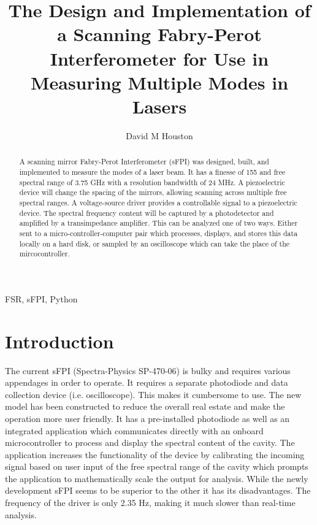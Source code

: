 \documentclass[12pt,journal]{IEEEtran}
\begin{document}
\title{The Design and Implementation of a Scanning Fabry-Perot Interferometer for Use in Measuring Multiple Modes in Lasers}
\author{David M Houston}

\maketitle


\begin{abstract}
A scanning mirror Fabry-Perot Interferometer (sFPI) was designed, built, and implemented to measure the modes of a laser beam. It has a finesse of 155 and free spectral range of 3.75 GHz with a resolution bandwidth of 24 MHz. A piezoelectric device will change the spacing of the mirrors, allowing scanning across multiple free spectral ranges. A voltage-source driver provides a controllable signal to a piezoelectric device. The spectral frequency content will be captured by a photodetector and amplified by a transimpedance amplifier. This can be analyzed one of two ways. Either sent to a micro-controller-computer pair which processes, displays, and stores this data locally on a hard disk, or sampled by an oscilloscope which can take the place of the mircocontroller.
\end{abstract}

\begin{IEEEkeywords}
FSR, sFPI, Python
\end{IEEEkeywords}

\section{Introduction} \label{ss:introduction}
The current sFPI (Spectra-Physics SP-470-06) is bulky and requires various appendages in order to operate. It requires a separate photodiode and data collection device (i.e. oscilloscope). This makes it cumbersome to use. The new model has been constructed to reduce the overall real estate and make the operation more user friendly. It has a pre-installed photodiode as well as an integrated application which communicates directly with an onboard microcontroller to process and display the spectral content of the cavity. The application increases the functionality of the device by calibrating the incoming signal based on user input of the free spectral range of the cavity which prompts the application to mathematically scale the output for analysis. While the newly development sFPI seems to be superior to the other it has its disadvantages. The frequency of the driver is only 2.35 Hz, making it much slower than real-time analysis.
\end{document}
